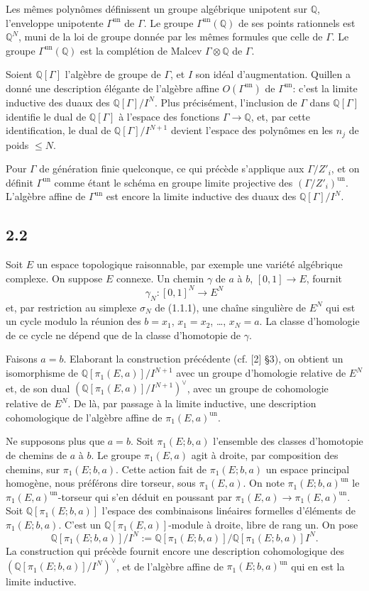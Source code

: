 \documentclass[10pt]{article}
\newcommand{\Q}{\mathbb Q}
\begin{document}
Les mêmes polynômes définissent un groupe algébrique unipotent sur $\Q$, l'enveloppe unipotente $\Gamma^{\mathrm{un}}$ de $\Gamma$. Le groupe $\Gamma^{\mathrm{un}}(\Q)$ de ses points rationnels est $\Q^N$, muni de la loi de groupe donnée par les mêmes formules que celle de $\Gamma$. Le groupe $\Gamma^{\mathrm{un}}(\Q)$ est la complétion de Malcev $\Gamma\otimes\Q$ de $\Gamma$.

Soient $\Q[\Gamma]$ l'algèbre de groupe de $\Gamma$, et $I$ son idéal d'augmentation. Quillen a donné une description élégante de l'algèbre affine $O(\Gamma^{\mathrm{un}})$ de $\Gamma^{\mathrm{un}}$: c'est la limite inductive des duaux des $\Q[\Gamma]/I^N$. Plus précisément, l'inclusion de $\Gamma$ dans $\Q[\Gamma]$ identifie le dual de $\Q[\Gamma]$ à l'espace des fonctions $\Gamma\to\Q$, et, par cette identification, le dual de $\Q[\Gamma]/I^{N+1}$ devient l'espace des polynômes en les $n_j$ de poids $\leq N$.

Pour $\Gamma$ de génération finie quelconque, ce qui précède s'applique aux $\Gamma/Z'_i$, et on définit $\Gamma^{\mathrm{un}}$ comme étant le schéma en groupe limite projective des $(\Gamma/Z'_i)^{\mathrm{un}}$. L'algèbre affine de $\Gamma^{\mathrm{un}}$ est encore la limite inductive des duaux des $\Q[\Gamma]/I^N$.

\subsection*{2.2}
Soit $E$ un espace topologique raisonnable, par exemple une variété algébrique complexe. On suppose $E$ connexe. Un chemin $\gamma$ de $a$ à $b$, $[0,1]\to E$, fournit
\[
 \gamma_N:[0,1]^N\to E^N
\]
et, par restriction au simplexe $\sigma_N$ de (1.1.1), une chaîne singulière de $E^N$ qui est un cycle modulo la réunion des $b=x_1$, $x_1=x_2$, \ldots, $x_N=a$. La classe d'homologie de ce cycle ne dépend que de la classe d'homotopie de $\gamma$.

Faisons $a=b$. Elaborant la construction précédente (cf. [2] \S3), on obtient un isomorphisme de $\Q[\pi_1(E,a)]/I^{N+1}$ avec un groupe d'homologie relative de $E^N$ et, de son dual $(\Q[\pi_1(E,a)]/I^{N+1})^\vee$, avec un groupe de cohomologie relative de $E^N$. De là, par passage à la limite inductive, une description cohomologique de l'algèbre affine de $\pi_1(E,a)^{\mathrm{un}}$.

Ne supposons plus que $a=b$. Soit $\pi_1(E;b,a)$ l'ensemble des classes d'homotopie de chemins de $a$ à $b$. Le groupe $\pi_1(E,a)$ agit à droite, par composition des chemins, sur $\pi_1(E;b,a)$. Cette action fait de $\pi_1(E;b,a)$ un espace principal homogène, nous préférons dire torseur, sous $\pi_1(E,a)$. On note $\pi_1(E;b,a)^{\mathrm{un}}$ le $\pi_1(E,a)^{\mathrm{un}}$-torseur qui s'en déduit en poussant par $\pi_1(E,a)\to\pi_1(E,a)^{\mathrm{un}}$. Soit $\Q[\pi_1(E;b,a)]$ l'espace des combinaisons linéaires formelles d'éléments de $\pi_1(E;b,a)$. C'est un $\Q[\pi_1(E,a)]$-module à droite, libre de rang un. On pose
\[
 \Q[\pi_1(E;b,a)]/I^N:=\Q[\pi_1(E;b,a)]/\Q[\pi_1(E;b,a)]I^N.
\]
La construction qui précède fournit encore une description cohomologique des $(\Q[\pi_1(E;b,a)]/I^N)^\vee$, et de l'algèbre affine de $\pi_1(E;b,a)^{\mathrm{un}}$ qui en est la limite inductive.
\end{document}
